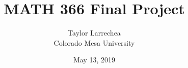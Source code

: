\title{MATH 366 Final Project}

\date{May 13, 2019}
\author{Taylor Larrechea \\  
  Colorado Mesa University}
\maketitle

